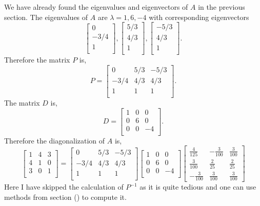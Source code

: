 \noindent We have already found the eigenvalues and eigenvectors of $A$ in the previous section. The eigenvalues of $A$ are $\lambda = 1, 6, -4$ with corresponding eigenvectors 
\[\begin{bmatrix} 0 \\ -3/4 \\ 1 \\ \end{bmatrix}, \begin{bmatrix} 5/3 \\ 4/3 \\ 1 \\ \end{bmatrix}, \begin{bmatrix} -5/3 \\ 4/3 \\ 1 \\ \end{bmatrix}.\]
Therefore the matrix $P$ is, 
\[P = \begin{bmatrix} 0 & 5/3 & -5/3 \\ -3/4 & 4/3 & 4/3 \\ 1 & 1 & 1 \\ \end{bmatrix}.\]
The matrix $D$ is,
\[D = \begin{bmatrix} 1 & 0 & 0 \\ 0 & 6 & 0 \\ 0 & 0 & -4 \\ \end{bmatrix}.\]
Therefore the diagonalization of $A$ is,
\[\begin{bmatrix} 1 & 4 & 3 \\ 4 & 1 & 0 \\ 3 & 0 & 1 \\ \end{bmatrix}
=  \begin{bmatrix} 0 & 5/3 & -5/3 \\ -3/4 & 4/3 & 4/3 \\ 1 & 1 & 1 \\ \end{bmatrix} \begin{bmatrix} 1 & 0 & 0 \\ 0 & 6 & 0 \\ 0 & 0 & -4 \\ \end{bmatrix} \begin{bmatrix} \frac{4}{125} & -\frac{3}{100} & \frac{3}{100} \\ \frac{3}{100} & \frac{2}{25} & \frac{2}{25} \\ -\frac{3}{100} & \frac{3}{100} & \frac{3}{100} \end{bmatrix}
\]
Here I have skipped the calculation of $P^{-1}$ as it is quite tedious and one can use methods from section () to compute it.





